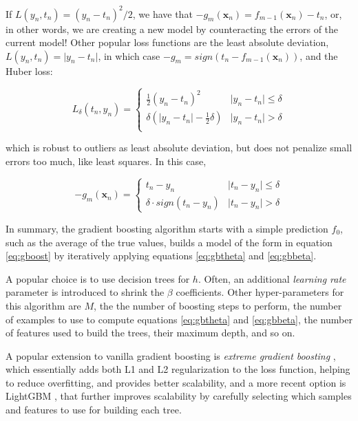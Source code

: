 \documentclass[a4paper,11pt]{kth-mag}
\begin{document}
If $L(y_n,t_n)=(y_n-t_n)^2/2$, we have that $-g_m(\bm x_n)=f_{m-1}(\bm x_n)-t_n$, or, in other words, we are creating a new model by counteracting the errors of the current model! Other popular loss functions are the least absolute deviation, $L(y_n,t_n)=\vert y_n-t_n\vert$, in which case $-g_m=sign(t_n-f_{m-1}(\bm x_n))$, and the Huber loss:

\begin{equation}
\label{eq:huberloss}
L_\delta(t_n,y_n)=\begin{cases}
\frac{1}{2}(y_n-t_n)^2 & \vert y_n-t_n \vert \leq \delta \\
\delta(\vert y_n-t_n\vert-\frac{1}{2}\delta) & \vert y_n-t_n \vert > \delta \\
\end{cases}
\end{equation}

\noindent which is robust to outliers as least absolute deviation, but does not penalize small errors too much, like least squares. In this case,

\begin{equation}
-g_m(\bm x_n)=\begin{cases}
t_n-y_n & \vert t_n-y_n\vert\leq\delta \\
\delta\cdot sign(t_n-y_n) & \vert t_n-y_n\vert>\delta
\end{cases}
\end{equation}

In summary, the gradient boosting algorithm starts with a simple prediction $f_0$, such as the average of the true values, builds a model of the form in equation \ref{eq:gboost} by iteratively applying equations \ref{eq:gbtheta} and \ref{eq:gbbeta}.

A popular choice is to use decision trees for $h$. Often, an additional \emph{learning rate} parameter is introduced to shrink the $\beta$ coefficients. Other hyper-parameters for this algorithm are $M$, the the number of boosting steps to perform, the number of examples to use to compute equations \ref{eq:gbtheta} and \ref{eq:gbbeta}, the number of features used to build the trees, their maximum depth, and so on.

A popular extension to vanilla gradient boosting is \emph{extreme gradient boosting} \citep{xgboost}, which essentially adds both L1 and L2 regularization to the loss function, helping to reduce overfitting, and provides better scalability, and a more recent option is LightGBM \citep{lightgbm}, that further improves scalability by carefully selecting which samples and features to use for building each tree.
\end{document}
